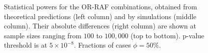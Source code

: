\begin{figure}[!tpb]
{        }%
\caption{
Statistical powers for the OR-RAF combinations, obtained from theoretical predictions (left column) and by simulations (middle column). Their absolute differences (right column) are shown at sample sizes ranging from $100$ to $100,000$ (top to bottom).
p-value threshold is at $5\times10^{-8}$.
Fractions of cases $\phi=50\%$.
}\label{fig:phi05}
\end{figure}

